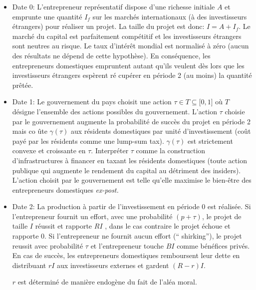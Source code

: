\documentclass[a4paper]{article}
\begin{document}
\begin{itemize}
\item Date 0: L'entrepreneur repr\'{e}sentatif dispose d'une richesse
initiale $A$ et emprunte une quantit\'{e} $I_{f}$ sur les march\'{e}s
internationaux (\`{a} des investisseurs \'{e}trangers) pour r\'{e}aliser un
projet. La taille du projet est donc: $I=A+I_{f}$. Le march\'{e} du capital
est parfaitement comp\'{e}titif et les investisseurs \'{e}trangers sont
neutres au risque. Le taux d'int\'{e}r\^{e}t mondial est normalis\'{e} \`{a}
z\'{e}ro (aucun des r\'{e}sultats ne d\'{e}pend de cette hypoth\`{e}se). En
cons\'{e}quence, les entrepreneurs domestiques empruntent autant qu'ils
veulent d\`{e}s lors que les investisseurs \'{e}trangers esp\`{e}rent r\'{e}%
cup\'{e}rer en p\'{e}riode 2 (au moins) la quantit\'{e} pr\^{e}t\'{e}e.

\item Date 1: Le gouvernement du pays choisit une action $\tau \in
T\subseteq \lbrack 0,1]$ o\`{u} $T$ d\'{e}signe l'ensemble des actions
possibles du gouvernement. L'action $\tau $ choisie par le gouvernement
augmente la probabilit\'{e} de succ\`{e}s du projet en p\'{e}riode 2 mais co%
\^{u}te $\gamma (\tau )$ aux r\'{e}sidents domestiques par unit\'{e}
d'investissement (co\^{u}t pay\'{e} par les r\'{e}sidents comme une lump-sum
tax). $\gamma (\tau )$ est strictement convexe et croissante en $\tau $.
Interpr\'{e}ter $\tau $ comme la construction d'infrastructures \`{a}
financer en taxant les r\'{e}sidents domestiques (toute action publique qui
augmente le rendement du capital au d\'{e}triment des insiders). L'action
choisit par le gouvernement est telle qu'elle maximise le bien-\^{e}tre des
entrepreneurs domestiques \textit{ex-post.}

\item Date 2: La production \`{a} partir de l'investissement en p\'{e}riode $%
0$ est r\'{e}alis\'{e}e. Si l'entrepreneur fournit un effort, avec une
probabilit\'{e} $(p+\tau )$, le projet de taille $I$ r\'{e}ussit et rapporte 
$RI$ , dans le cas contraire le projet \'{e}choue et rapporte $0$. Si
l'entrepreneur ne fournit aucun effort (\textquotedblleft
shirking\textquotedblright ), le projet reussit avec probabilit\'{e} $\tau $
et l'entrepreneur touche $BI$ comme b\'{e}n\'{e}fices priv\'{e}s. En cas de
succ\`{e}s, les entrepreneurs domestiques remboursent leur dette en
distribuant $rI$ aux investisseurs externes et gardent $\left( R-r\right) I$.

$r$ est d\'{e}termin\'{e} de mani\`{e}re endog\`{e}ne du fait de l'al\'{e}a
moral.
\end{itemize}
\end{document}
